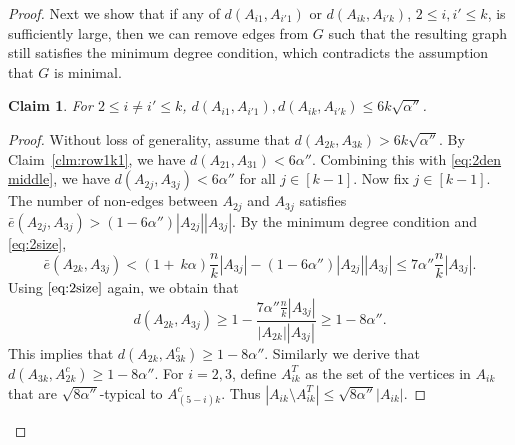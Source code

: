 \documentclass[reqno]{amsart}
\theoremstyle{plain}
\newtheorem{claim}[theorem]{Claim}
\def\a{\alpha}
\begin{document}
\begin{proof}
Next we show that if any of $d(A_{i1},A_{i'1})$ or $d(A_{ik},A_{i'k})$, $2\le i,i'\le k$, is sufficiently large, then we can remove edges from $G$ such that the resulting graph still satisfies the minimum degree condition, which contradicts the assumption that $G$ is minimal.
\begin{claim}\label{clm:row1k2}
For $2\le i \ne i'\le k$, $d(A_{i1},A_{i'1}), d(A_{ik},A_{i'k}) \le 6k \sqrt{\alpha''}$.
\end{claim}

\begin{proof}
Without loss of generality,  assume that $d(A_{2k}, A_{3k}) > 6k \sqrt{\a''}$. By Claim~\ref{clm:row1k1},
we have $d(A_{21},A_{31})< 6\alpha''$. Combining this with \eqref{eq:2den middle}, we have $d(A_{2j},A_{3j})< 6\alpha''$ for all $j\in [k-1]$. Now fix $j\in[k-1]$. The number of non-edges between $A_{2j}$ and $A_{3j}$ satisfies $\bar{e} (A_{2j},A_{3j}) > (1 - 6\a'') |A_{2j}| |A_{3j}|$. By the minimum degree condition and \eqref {eq:2size},
\[
\bar {e} (A_{2k},A_{3j}) < (1 +\ k \alpha) \frac{n}{k} |A_{3j}|-(1- 6\alpha'')|A_{2j}||A_{3j}| \le 7\alpha'' \frac{n}{k} |A_{3j}|. %
\]
Using $\eqref {eq:2size}$ again, we obtain that
\[
d(A_{2k},A_{3j})\ge 1-\frac{7 \a'' \tfrac{n}{k} |A_{3j}|}{|A_{2k}||A_{3j}|}\ge 1-8\alpha''.
\]
This implies that $d(A_{2k},A_{3k}^c)\ge 1- 8\alpha''$. Similarly we derive that $d(A_{3k},A_{2k}^c)\ge 1- 8\alpha''$. For $i = 2,3$, define $A_{ik}^T$ as the set of the vertices in $A_{ik}$ that are  $\sqrt{8\alpha''}$-typical to $A_{(5-i)k}^c$. Thus $|A_{ik}\setminus A_{ik}^T|\le \sqrt{8\alpha''}|A_{ik}|$.


\end{proof}
\end{proof}
\end{document}
